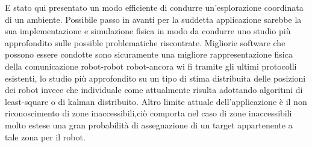 E stato qui presentato un modo efficiente di condurre un'esplorazione coordinata di un ambiente. Possibile passo in avanti per la suddetta applicazione sarebbe la sua implementazione e simulazione fisica in modo da condurre uno studio più approfondito sulle possible problematiche riscontrate. Migliorie software che possono essere condotte sono sicuramente una migliore rappresentazione fisica della comunicazione robot-robot robot-ancora wi fi tramite gli ultimi protocolli esistenti, lo studio più approfondito su un tipo di stima distribuita delle posizioni dei robot invece che individuale come attualmente risulta adottando algoritmi di least-square o di kalman distribuito. Altro limite attuale dell'applicazione è il non riconoscimento di zone inaccessibili,ciò comporta nel caso di zone inaccessibili molto estese una gran probabilità di assegnazione di un target appartenente a tale zona per il robot.